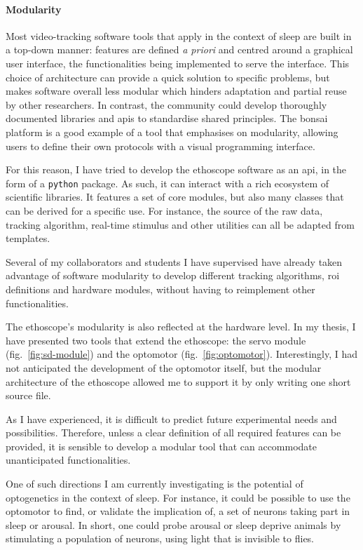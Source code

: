 \paragraph*{Modularity}

Most video-tracking software tools that apply in the context of sleep are built in a top-down manner: features are defined \emph{a priori} and centred around a graphical user interface, the functionalities being implemented to serve the interface.
This choice of architecture can provide a quick solution to specific problems, but makes software overall less modular which hinders adaptation and partial reuse by other researchers.
In contrast, the community could develop thoroughly documented libraries and \glspl{api} to standardise shared principles.
The bonsai platform is a good example of a tool that emphasises on modularity, allowing users to define their own protocols with a visual programming interface\cite{lopes_bonsai_2015}.


For this reason, I have tried to develop the ethoscope software as an \gls{api}, in the form of a \texttt{python} package.
As such, it can interact with a rich ecosystem of scientific libraries.
It features a set of core modules, but also many classes that can be derived for a specific use.
For instance, the source of the raw data, tracking algorithm, real-time stimulus and other utilities can all be adapted from templates.

Several of my collaborators and students I have supervised have already taken advantage of software modularity to develop different tracking algorithms, \gls{roi} definitions and hardware modules, without having to reimplement other functionalities.

The ethoscope's modularity is also reflected at the hardware level. 
In my thesis, I have presented two tools that extend the ethoscope: the servo module (fig.~\ref{fig:sd-module}) and the optomotor (fig.~\ref{fig:optomotor}).
Interestingly, I had not anticipated the development of the optomotor itself,
but the modular architecture of the ethoscope allowed me to support it by only writing one short source file.

As I have experienced, it is difficult to predict future experimental needs and possibilities.
Therefore, unless a clear definition of all required features can be provided, it is sensible to develop a modular tool that can accommodate unanticipated functionalities.

One of such directions I am currently investigating is the potential of optogenetics\cite{riemensperger_optogenetics_2016} in the context of sleep.
For instance, it could be possible to use the optomotor to find, or validate the implication of, a set of neurons taking part in sleep or arousal. 
In short, one could probe arousal or sleep deprive animals by stimulating a population of neurons, using light that is invisible to flies. 

